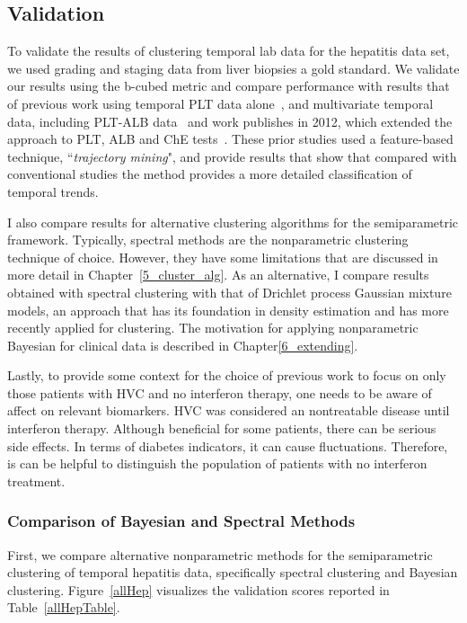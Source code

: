 \subsection{Validation}
\label{hep_results}
To validate the results of clustering temporal lab data for the hepatitis data set, we used grading and staging data from liver biopsies a gold standard.  We validate our results using the b-cubed metric and compare performance with results that of previous work using temporal PLT data alone~\cite{Hirano05}, and multivariate temporal data, including PLT-ALB data~\cite{ Hirano07a,Hirano07b} and work publishes in 2012, which extended the approach to PLT, ALB and ChE tests~\cite{Tsumoto12}.  These prior studies used a feature-based technique, ``\emph{trajectory mining}", and provide results that show that compared with conventional studies the method provides a more detailed classification of temporal trends.

I also compare results for alternative clustering algorithms for the semiparametric framework.  Typically, spectral methods are the nonparametric clustering technique of choice.  However, they have some limitations that are discussed in more detail in Chapter~\ref{5_cluster_alg}.  As an alternative, I compare results obtained with spectral clustering with that of Drichlet process Gaussian mixture models, an approach that has its foundation in density estimation and has more recently applied for clustering.  The motivation for applying nonparametric Bayesian for clinical data is described in Chapter\ref{6_extending}.

Lastly, to provide some context for the choice of previous work to focus on only those patients with HVC and no interferon therapy, one needs to be aware of affect on relevant biomarkers.  HVC was considered an nontreatable disease until interferon therapy.  Although beneficial for some patients, there can be serious side effects.  In terms of diabetes indicators, it can cause fluctuations.  Therefore, is can be helpful to distinguish the population of patients with no interferon treatment.

\subsubsection{Comparison of Bayesian and Spectral Methods}
First, we compare alternative nonparametric methods for the semiparametric clustering of temporal hepatitis data, specifically spectral clustering and Bayesian clustering.  Figure~\ref{allHep} visualizes the validation scores reported in Table~\ref{allHepTable}.

